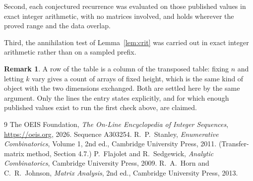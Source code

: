 \documentclass[11pt,a4paper]{article}
\theoremstyle{plain}
\theoremstyle{definition}
\newtheorem{remark}[theorem]{Remark}
\begin{document}
Second, each conjectured recurrence was evaluated on those published values in exact
integer arithmetic, with no matrices involved, and holds wherever the proved range and the
data overlap.

Third, the annihilation test of Lemma~\ref{lem:crit} was carried out in exact integer
arithmetic rather than on a sampled prefix.

\begin{remark}
A row of the table is a column of the transposed table: fixing $n$ and letting $k$ vary gives a
count of arrays of fixed height, which is the same kind of object with the two dimensions
exchanged. Both are settled here by the same argument. Only the lines the entry states
explicitly, and for which enough published values exist to run the first check above, are
claimed.
\end{remark}

\begin{thebibliography}{9}
 The OEIS Foundation, \emph{The On-Line Encyclopedia of Integer
Sequences}, \url{https://oeis.org}, 2026. Sequence A303254.
 R.~P.~Stanley, \emph{Enumerative Combinatorics}, Volume 1, 2nd ed.,
Cambridge University Press, 2011. (Transfer-matrix method, Section 4.7.)
 P.~Flajolet and R.~Sedgewick, \emph{Analytic Combinatorics}, Cambridge
University Press, 2009.
 R.~A.~Horn and C.~R.~Johnson, \emph{Matrix Analysis}, 2nd ed., Cambridge
University Press, 2013.
\end{thebibliography}
\end{document}
